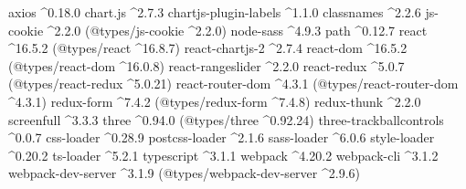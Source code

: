 \documentclass[a4paper,12pt]{article}
\begin{document}
axios \textasciicircum0.18.0\newline
chart.js \textasciicircum2.7.3\newline
chartjs-plugin-labels \textasciicircum1.1.0\newline
classnames \textasciicircum2.2.6\newline
js-cookie \textasciicircum2.2.0 (@types/js-cookie \textasciicircum2.2.0)\newline
node-sass \textasciicircum4.9.3\newline
path \textasciicircum0.12.7\newline
react \textasciicircum16.5.2 (@types/react \textasciicircum16.8.7)\newline
react-chartjs-2 \textasciicircum2.7.4\newline
react-dom \textasciicircum16.5.2 (@types/react-dom \textasciicircum16.0.8)\newline
react-rangeslider \textasciicircum2.2.0\newline
react-redux \textasciicircum5.0.7 (@types/react-redux \textasciicircum5.0.21)\newline
react-router-dom \textasciicircum4.3.1 (@types/react-router-dom \textasciicircum4.3.1)\newline
redux-form \textasciicircum7.4.2 (@types/redux-form \textasciicircum7.4.8)\newline
redux-thunk \textasciicircum2.2.0\newline
screenfull \textasciicircum3.3.3\newline
three \textasciicircum0.94.0 (@types/three \textasciicircum0.92.24)\newline
three-trackballcontrols \textasciicircum0.0.7\newline
css-loader \textasciicircum0.28.9\newline
postcss-loader \textasciicircum2.1.6\newline
sass-loader \textasciicircum6.0.6\newline
style-loader \textasciicircum0.20.2\newline
ts-loader \textasciicircum5.2.1\newline
typescript \textasciicircum3.1.1\newline
webpack \textasciicircum4.20.2\newline
webpack-cli \textasciicircum3.1.2\newline
webpack-dev-server \textasciicircum3.1.9 (@types/webpack-dev-server \textasciicircum2.9.6)

\clearpage {}\label{prilohaD} 
\end{document}
